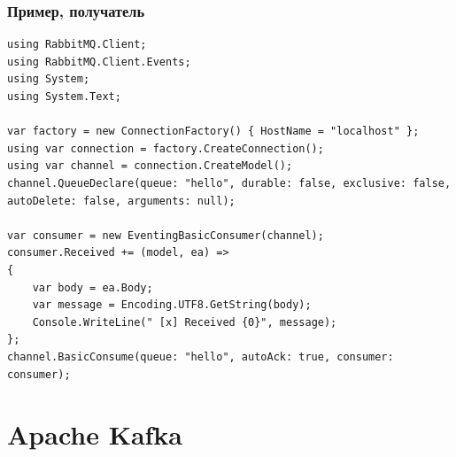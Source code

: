 \documentclass[xetex,mathserif,serif]{beamer}
\begin{document}
    \begin{frame}[fragile]
        \frametitle{Пример, получатель}
        \begin{ssmall}
            \begin{verbatim}
using RabbitMQ.Client;
using RabbitMQ.Client.Events;
using System;
using System.Text;

var factory = new ConnectionFactory() { HostName = "localhost" };
using var connection = factory.CreateConnection();
using var channel = connection.CreateModel();
channel.QueueDeclare(queue: "hello", durable: false, exclusive: false, autoDelete: false, arguments: null);

var consumer = new EventingBasicConsumer(channel);
consumer.Received += (model, ea) =>
{
    var body = ea.Body;
    var message = Encoding.UTF8.GetString(body);
    Console.WriteLine(" [x] Received {0}", message);
};
channel.BasicConsume(queue: "hello", autoAck: true, consumer: consumer);
            \end{verbatim}
        \end{ssmall}
    \end{frame}

    \section{Apache Kafka}
\end{document}
